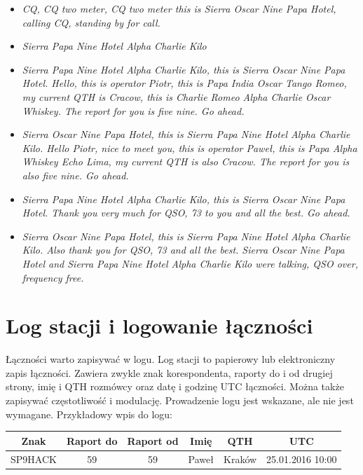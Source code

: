 \documentclass[a4paper,11pt]{article}
\begin{document}
\begin{itemize}
\item \textit{CQ, CQ two meter, CQ two meter this is Sierra Oscar Nine Papa Hotel, calling CQ, standing by for call.}
\item \textit{Sierra Papa Nine Hotel Alpha Charlie Kilo}
\item \textit{Sierra Papa Nine Hotel Alpha Charlie Kilo, this is Sierra Oscar Nine Papa Hotel. Hello, this is operator Piotr, this is Papa India Oscar Tango Romeo, my current QTH is Cracow, this is Charlie Romeo Alpha Charlie Oscar Whiskey. The report for you is five nine. Go ahead.}
\item \textit{Sierra Oscar Nine Papa Hotel, this is Sierra Papa Nine Hotel Alpha Charlie Kilo. Hello Piotr, nice to meet you, this is operator Paweł, this is Papa Alpha Whiskey Echo Lima, my current QTH is also Cracow. The report for you is also five nine. Go ahead.}
\item \textit{Sierra Papa Nine Hotel Alpha Charlie Kilo, this is Sierra Oscar Nine Papa Hotel. Thank you very much for QSO, 73 to you and all the best. Go ahead.}
\item \textit{Sierra Oscar Nine Papa Hotel, this is Sierra Papa Nine Hotel Alpha Charlie Kilo. Also thank you for QSO, 73 and all the best. Sierra Oscar Nine Papa Hotel and Sierra Papa Nine Hotel Alpha Charlie Kilo were talking, QSO over, frequency free.}
\end{itemize}
\section{Log stacji i logowanie łączności}
Łączności warto zapisywać w logu. Log stacji to papierowy lub elektroniczny zapis łączności. Zawiera zwykle znak korespondenta, raporty do i od drugiej strony, imię i QTH rozmówcy oraz datę i godzinę UTC łączności. Można także zapisywać częstotliwość i modulację. Prowadzenie logu jest wskazane, ale nie jest wymagane. Przykładowy wpis do logu:
\begin{center}
\begin{tabular}{| c | c | c | c | c | c |}
\hline
\textbf{Znak} & \textbf{Raport do} & \textbf{Raport od} & \textbf{Imię} & \textbf{QTH} & \textbf{UTC} \\ \hline
SP9HACK & 59 & 59 & Paweł & Kraków & 25.01.2016 10:00 \\ \hline
\end{tabular}
\end{center}
\end{document}
